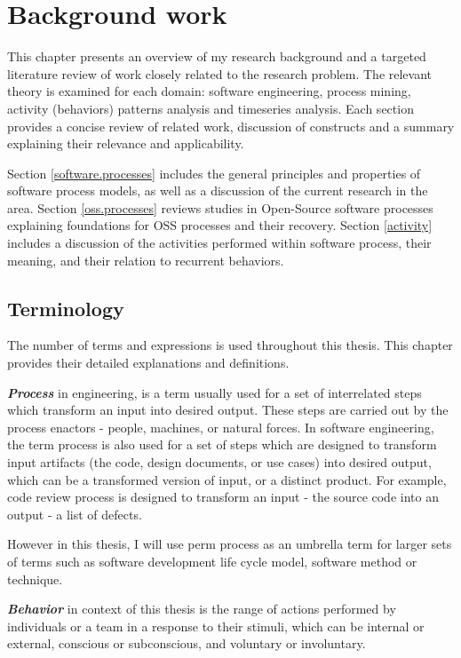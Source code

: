 \chapter{Background work}
This chapter presents an overview of my research background and a targeted literature 
review of work closely related to the research problem.
The relevant theory is examined for each domain: software engineering, process mining,
activity (behaviors) patterns analysis and timeseries analysis. Each section provides a 
concise review 
of related work, discussion of constructs and a summary explaining their relevance and 
applicability. 

Section \ref{software.processes} includes the general principles and properties of 
software process models, as well as a discussion of the current research in the area.
Section \ref{oss.processes} reviews studies in Open-Source software processes
explaining foundations for OSS processes and their recovery.
Section \ref{activity} includes a discussion of the activities performed within software
process, their meaning, and their relation to recurrent behaviors.

\section{Terminology}\label{definitions}
The number of terms and expressions is used throughout this thesis. This chapter provides
their detailed explanations and definitions.

\textit{\textbf{Process}} in engineering, is a term usually used for a set of interrelated 
steps which transform an input into desired output. These steps are carried out by the process
enactors - people, machines, or natural forces. In software engineering, the term process is 
also used for a set of steps which are designed to transform input artifacts (the code, design
documents, or use cases) into desired output, which can be a transformed version of input, or a
distinct product. For example, code review process is designed to transform an input - the 
source code into an output - a list of defects.

However in this thesis, I will use perm process as an umbrella term for larger sets of terms
such as software development life cycle model, software method or technique. 

\textit{\textbf{Behavior}} in context of this thesis is the range of actions performed by 
individuals or a team in a response to their stimuli, which can be internal or external, 
conscious or subconscious, and voluntary or involuntary. 

